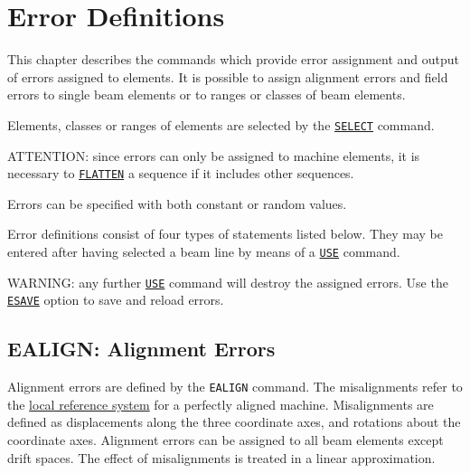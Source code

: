 
\chapter{Error Definitions}
\label{chap:error}
This chapter describes the commands which provide error assignment and
output of errors assigned to elements. It is possible to assign
alignment errors and field errors to single beam elements or to ranges
or classes of beam elements.

Elements, classes or ranges of elements are selected by the
\hyperref[sec:seclect]{\tt SELECT} command.

ATTENTION: since errors can only be assigned to machine elements, it is
necessary to \hyperref[sec:flatten]{\tt FLATTEN} a sequence
if it includes other sequences.

Errors can be specified with both constant or random values.

Error definitions consist of four types of statements listed below. They
may be entered after having selected a beam line by means of a
\hyperref[sec:use]{\tt USE} command.  

WARNING: any further \hyperref[sec:use]{\tt USE} command
will destroy the assigned errors. Use the
\hyperref[sec:esave]{\tt ESAVE} option to save and reload errors.



%

\section{EALIGN: Alignment Errors} %
\label{sec:ealign}

Alignment errors are defined by the {\tt EALIGN} command. 
The misalignments refer to the
\hyperref[sec:reference]{local reference system} for a
perfectly aligned machine.  
Misalignments are defined as displacements along the three coordinate
axes, and rotations about the coordinate axes. 
Alignment errors can be assigned to all beam elements except drift
spaces. 
The effect of misalignments is treated in a linear
approximation.

